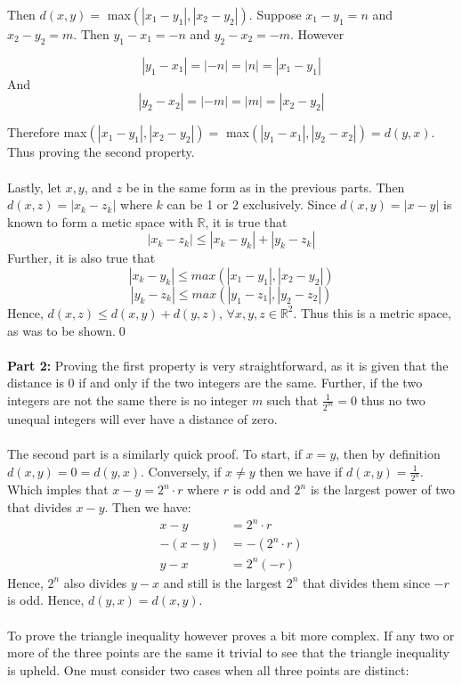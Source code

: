 \documentclass[12pt, letterpaper]{article}
\begin{document}
\noindent Then $d(x, y) = $ max$(|x_1 - y_1|, |x_2 - y_2|)$. Suppose $x_1 - y_1 = n$ and $x_2 - y_2 = m$. Then $y_1 - x_1 = -n$ and $y_2 - x_2 = -m$.
However

$$ |y_1 - x_1| = |-n| = |n| = |x_1 - y_1|$$
And
$$|y_2 - x_2| = |-m| = |m| = |x_2 - y_2| $$

\noindent Therefore max$(|x_1 - y_1|, |x_2 - y_2|) = $ max$(|y_1 - x_1|, |y_2 - x_2|) = d(y, x)$. Thus proving the second property.\\
\\
\noindent Lastly, let $x, y$, and $z$ be in the same form as in the previous parts. Then $d(x, z) = |x_k - z_k|$ where $k$ can be 1 or 2 exclusively.
Since $d(x, y) = |x - y|$ is known to form a metic space with $\mathbb{R}$, it is true that
$$ |x_k - z_k| \leq |x_k - y_k| + |y_k - z_k| $$
\noindent Further, it is also true that
$$|x_k - y_k| \leq max(|x_1 - y_1|, |x_2 - y_2|)$$
$$|y_k - z_k| \leq max(|y_1 - z_1|, |y_2 - z_2|)$$
Hence, $d(x, z) \leq d(x, y) + d(y, z)$, $\forall x, y, z \in \mathbb{R}^2$. Thus this is a metric space, as was to be shown.\qed\\
\\
\noindent\textbf{Part 2:}
Proving the first property is very straightforward, as it is given that the distance is 0 if and only if the two integers are the same.
Further, if the two integers are not the same there is no integer $m$ such that $\frac{1}{2^m} = 0$ thus no two unequal integers will ever have a distance of zero.\\
\\
The second part is a similarly quick proof. To start, if $x = y$, then by definition $d(x, y) = 0 = d(y, x)$. Conversely, if $x \neq y$ then we have if $d(x, y) = \frac{1}{2^n}$.
Which imples that $x - y = 2^n \cdot r$ where $r$ is odd and $2^n$ is the largest power of two that divides $x - y$. Then we have:
\begin{align*}
  x - y &= 2^n \cdot r\\
  -(x - y) &= -(2^n \cdot r)\\
  y - x &= 2^n(-r)
\end{align*}
Hence, $2^n$ also divides $y - x$ and still is the largest $2^n$ that divides them since $-r$ is odd. Hence, $d(y, x) = d(x, y)$.\\
\\
To prove the triangle inequality however proves a bit more complex. If any two or more of the three points are the same it trivial to see that the triangle inequality is upheld.
One must consider two cases when all three points are distinct:\\
\end{document}
